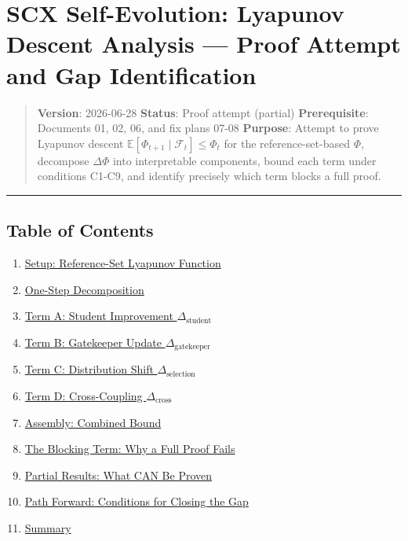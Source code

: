 \documentclass[
  12pt,
]{article}
\author{SCX}
\date{2026}
\providecommand{\tightlist}{%
  \setlength{\itemsep}{0pt}\setlength{\parskip}{0pt}}
\begin{document}
\section{SCX Self-Evolution: Lyapunov Descent Analysis --- Proof Attempt
and Gap
Identification}\label{scx-self-evolution-lyapunov-descent-analysis-proof-attempt-and-gap-identification}

\begin{quote}
\textbf{Version}: 2026-06-28 \textbar{} \textbf{Status}: Proof attempt
(partial) \textbar{} \textbf{Prerequisite}: Documents 01, 02, 06, and
fix plans 07-08 \textbf{Purpose}: Attempt to prove Lyapunov descent
\(\mathbb{E}[\Phi_{t+1} \mid \mathcal{F}_t] \leq \Phi_t\) for the
reference-set-based \(\Phi\), decompose \(\Delta\Phi\) into
interpretable components, bound each term under conditions C1-C9, and
identify precisely which term blocks a full proof.
\end{quote}

\begin{center}\rule{0.5\linewidth}{0.5pt}\end{center}

\subsection{Table of Contents}\label{table-of-contents}

\begin{enumerate}
\def\labelenumi{\arabic{enumi}.}
\tightlist
\item
  \hyperref[1-setup-reference-set-lyapunov-function]{Setup:
  Reference-Set Lyapunov Function}
\item
  \hyperref[2-one-step-decomposition]{One-Step Decomposition}
\item
  \hyperref[3-term-a-student-improvement-deltatextstudent]{Term A:
  Student Improvement \(\Delta_{\text{student}}\)}
\item
  \hyperref[4-term-b-gatekeeper-update-deltatextgatekeeper]{Term B:
  Gatekeeper Update \(\Delta_{\text{gatekeeper}}\)}
\item
  \hyperref[5-term-c-distribution-shift-deltatextselection]{Term C:
  Distribution Shift \(\Delta_{\text{selection}}\)}
\item
  \hyperref[6-term-d-cross-coupling-deltatextcross]{Term D:
  Cross-Coupling \(\Delta_{\text{cross}}\)}
\item
  \hyperref[7-assembly-combined-bound]{Assembly: Combined Bound}
\item
  \hyperref[8-the-blocking-term-why-a-full-proof-fails]{The Blocking
  Term: Why a Full Proof Fails}
\item
  \hyperref[9-partial-results-what-can-be-proven]{Partial Results: What
  CAN Be Proven}
\item
  \hyperref[10-path-forward-conditions-for-closing-the-gap]{Path
  Forward: Conditions for Closing the Gap}
\item
  \hyperref[11-summary]{Summary}
\end{enumerate}
\end{document}
